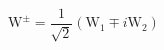 \begin{equation}
\label{eqn:Wpm}
\textrm{W}^{\pm}=\frac{1}{\sqrt{2}}\left(\textrm{W}_{1}\mp i\textrm{W}_{2}\right)
\end{equation}






